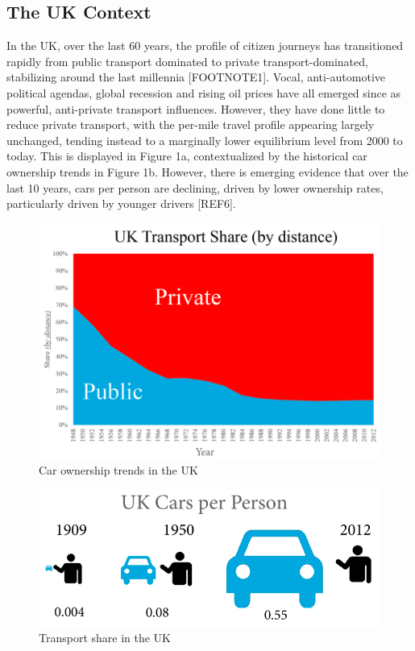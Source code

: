 \documentclass[journal]{IEEEtran}
\begin{document}
\subsection{The UK Context}

In the UK, over the last 60 years, the profile of citizen journeys has
transitioned rapidly from public transport dominated to private
transport-dominated, stabilizing around the last millennia
[FOOTNOTE1]. Vocal, anti-automotive political agendas, global
recession and rising oil prices have all emerged since as powerful,
anti-private transport influences. However, they have done little to
reduce private transport, with the per-mile travel profile appearing
largely unchanged, tending instead to a marginally lower equilibrium
level from 2000 to today. This is displayed in Figure 1a,
contextualized by the historical car ownership trends in Figure
1b. However, there is emerging evidence that over the last 10 years,
cars per person are declining, driven by lower ownership rates,
particularly driven by younger drivers [REF6]. 


\begin{figure}[!htp]
\centering
\includegraphics[width=\columnwidth]{images/uktransportshare.png}
\caption{Car ownership trends in the UK}
\label{fig:uktransportshare}
\end{figure}

\begin{figure}[!htp]
\centering
\includegraphics[width=\columnwidth]{images/ukcarsperperson.png}
\caption{Transport share in the UK}
\label{fig:ukcarsperperson}
\end{figure}
\end{document}
